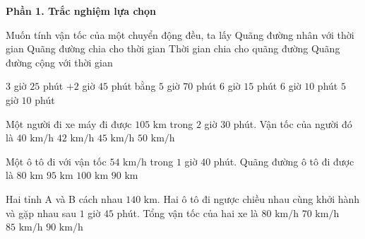 \textbf{Phần 1. Trắc nghiệm lựa chọn}

\begin{ex} %
Muốn tính vận tốc của một chuyển động đều, ta lấy
\choice
{Quãng đường nhân với thời gian}
{\True Quãng đường chia cho thời gian}
{Thời gian chia cho quãng đường}
{Quãng đường cộng với thời gian}
\end{ex}

\begin{ex} %
$3$ giờ $25$ phút $+ 2$ giờ $45$ phút bằng
\choice
{$5$ giờ $70$ phút}
{$6$ giờ $15$ phút}
{\True $6$ giờ $10$ phút}
{$5$ giờ $10$ phút}
\end{ex}

\begin{ex} %
Một người đi xe máy đi được $105\text{ km}$ trong $2$ giờ $30$ phút. Vận tốc của người đó là
\choice
{$40\text{ km/h}$}
{\True $42\text{ km/h}$}
{$45\text{ km/h}$}
{$50\text{ km/h}$}
\end{ex}

\begin{ex} %
Một ô tô đi với vận tốc $54\text{ km/h}$ trong $1$ giờ $40$ phút. Quãng đường ô tô đi được là
\choice
{$80\text{ km}$}
{$95\text{ km}$}
{$100\text{ km}$}
{\True $90\text{ km}$}
\end{ex}

\begin{ex} %
Hai tỉnh A và B cách nhau $140\text{ km}$. Hai ô tô đi ngược chiều nhau cùng khởi hành và gặp nhau sau $1$ giờ $45$ phút. Tổng vận tốc của hai xe là
\choice
{\True $80\text{ km/h}$}
{$70\text{ km/h}$}
{$85\text{ km/h}$}
{$90\text{ km/h}$}
\end{ex}

